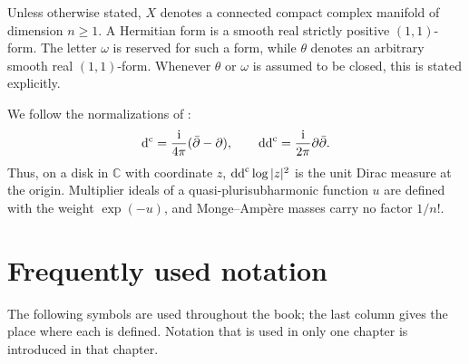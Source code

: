 
Unless otherwise stated, $X$ denotes a connected compact complex manifold of dimension $n\geq1$. A Hermitian form is a smooth real strictly positive $(1,1)$-form. The letter $\omega$ is reserved for such a form, while $\theta$ denotes an arbitrary smooth real $(1,1)$-form. Whenever $\theta$ or $\omega$ is assumed to be closed, this is stated explicitly.

We follow the normalizations of \cite{SGPT}:
\[
 \mathrm d^{\mathrm c}=\frac{\mathrm i}{4\pi}(\bar\partial-\partial),
 \qquad \mathrm{dd}^{\mathrm{c}}=\frac{\mathrm i}{2\pi}\partial\bar\partial.
\]
Thus, on a disk in $\mathbb C$ with coordinate $z$, $\mathrm{dd}^{\mathrm{c}}\log|z|^2$ is the unit Dirac measure at the origin. Multiplier ideals of a quasi-plurisubharmonic function $u$ are defined with the weight $\exp(-u)$, and Monge--Amp\`ere masses carry no factor $1/n!$.

\clearpage
\section*{Frequently used notation}

The following symbols are used throughout the book; the last column gives the place where each is defined. Notation that is used in only one chapter is introduced in that chapter.

